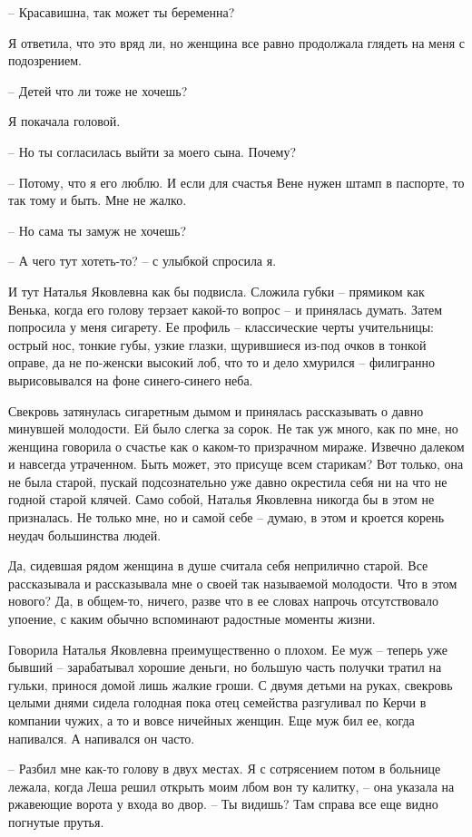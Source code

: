 \documentclass[
]{book}
\begin{document}
-- Красавишна, так может ты беременна?

Я ответила, что это вряд ли, но женщина все равно продолжала глядеть на меня с подозрением.

-- Детей что ли тоже не хочешь?

Я покачала головой.

-- Но ты согласилась выйти за моего сына. Почему?

-- Потому, что я его люблю. И если для счастья Вене нужен штамп в паспорте, то так тому и быть. Мне не жалко.

-- Но сама ты замуж не хочешь?

-- А чего тут хотеть-то? -- с улыбкой спросила я.

И тут Наталья Яковлевна как бы подвисла. Сложила губки -- прямиком как Венька, когда его голову терзает какой-то вопрос -- и принялась думать. Затем попросила у меня сигарету. Ее профиль -- классические черты учительницы: острый нос, тонкие губы, узкие глазки, щурившиеся из-под очков в тонкой оправе, да не по-женски высокий лоб, что то и дело хмурился -- филигранно вырисовывался на фоне синего-синего неба.

Свекровь затянулась сигаретным дымом и принялась рассказывать о давно минувшей молодости. Ей было слегка за сорок. Не так уж много, как по мне, но женщина говорила о счастье как о каком-то призрачном мираже. Извечно далеком и навсегда утраченном. Быть может, это присуще всем старикам? Вот только, она не была старой, пускай подсознательно уже давно окрестила себя ни на что не годной старой клячей. Само собой, Наталья Яковлевна никогда бы в этом не призналась. Не только мне, но и самой себе -- думаю, в этом и кроется корень неудач большинства людей.

Да, сидевшая рядом женщина в душе считала себя неприлично старой. Все рассказывала и рассказывала мне о своей так называемой молодости. Что в этом нового? Да, в общем-то, ничего, разве что в ее словах напрочь отсутствовало упоение, с каким обычно вспоминают радостные моменты жизни.

Говорила Наталья Яковлевна преимущественно о плохом. Ее муж -- теперь уже бывший -- зарабатывал хорошие деньги, но большую часть получки тратил на гульки, принося домой лишь жалкие гроши. С двумя детьми на руках, свекровь целыми днями сидела голодная пока отец семейства разгуливал по Керчи в компании чужих, а то и вовсе ничейных женщин. Еще муж бил ее, когда напивался. А напивался он часто.

-- Разбил мне как-то голову в двух местах. Я с сотрясением потом в больнице лежала, когда Леша решил открыть моим лбом вон ту калитку, -- она указала на ржавеющие ворота у входа во двор. -- Ты видишь? Там справа все еще видно погнутые прутья.
\end{document}

